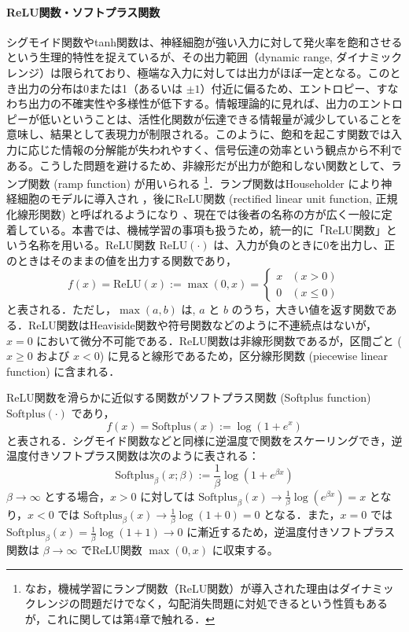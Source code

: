 \documentclass[titlepage]{ltjsbook}
\begin{document}
\paragraph{ReLU関数・ソフトプラス関数}
シグモイド関数やtanh関数は、神経細胞が強い入力に対して発火率を飽和させるという生理的特性を捉えているが、その出力範囲（dynamic range, ダイナミックレンジ）は限られており、極端な入力に対しては出力がほぼ一定となる。このとき出力の分布は0または1（あるいは $\pm 1$）付近に偏るため、エントロピー、すなわち出力の不確実性や多様性が低下する。情報理論的に見れば、出力のエントロピーが低いということは、活性化関数が伝達できる情報量が減少していることを意味し、結果として表現力が制限される。このように、飽和を起こす関数では入力に応じた情報の分解能が失われやすく、信号伝達の効率という観点から不利である。こうした問題を避けるため、非線形だが出力が飽和しない関数として、ランプ関数 (ramp function) が用いられる \footnote{なお，機械学習にランプ関数（ReLU関数）が導入された理由はダイナミックレンジの問題だけでなく，勾配消失問題に対処できるという性質もあるが，これに関しては第4章で触れる．}．ランプ関数はHouseholder により神経細胞のモデルに導入され \citep{householder1941theory}，後にReLU関数 (rectified linear unit function, 正規化線形関数) と呼ばれるようになり \citep{nair2010rectified}、現在では後者の名称の方が広く一般に定着している。本書では、機械学習の事項も扱うため，統一的に「ReLU関数」という名称を用いる。ReLU関数 $\textrm{ReLU}(\cdot)$ は、入力が負のときに0を出力し、正のときはそのままの値を出力する関数であり，
\begin{equation}
f(x) = \textrm{ReLU}(x):=\max(0, x)=
\begin{cases}
x & (x > 0) \\
0 & (x \leq 0)
\end{cases}
\end{equation}
と表される．ただし，$\max(a, b)$ は, $a$ と $b$ のうち，大きい値を返す関数である．ReLU関数はHeaviside関数や符号関数などのように不連続点はないが，$x=0$ において微分不可能である．ReLU関数は非線形関数であるが，区間ごと ($x\geq 0$ および $x<0$) に見ると線形であるため，区分線形関数 (piecewise linear function) に含まれる．

ReLU関数を滑らかに近似する関数がソフトプラス関数 (Softplus function) $\textrm{Softplus}(\cdot)$ であり，
\begin{equation}
f(x) = \textrm{Softplus}(x):=\log(1+e^x)
\end{equation}
と表される．シグモイド関数などと同様に逆温度で関数をスケーリングでき，逆温度付きソフトプラス関数は次のように表される：
\begin{equation}
\textrm{Softplus}_\beta(x; \beta):=\frac{1}{\beta}\log(1+e^{\beta x})
\end{equation}
$\beta \to \infty$ とする場合，$x>0$ に対しては $\mathrm{Softplus}_\beta(x)\to \frac{1}{\beta} \log(e^{\beta x}) = x$ となり，$x<0$ では $\mathrm{Softplus}_\beta(x)\to \frac{1}{\beta} \log(1+0) = 0$ となる．また，$x=0$ では $\mathrm{Softplus}_\beta(x)=\frac{1}{\beta}\log(1+1)\to 0$ に漸近するため，逆温度付きソフトプラス関数は $\beta \to \infty$ でReLU関数 $\max(0, x)$ に収束する。
\end{document}
